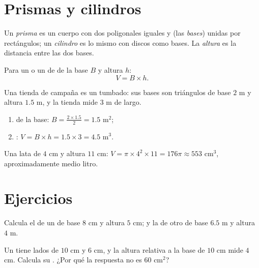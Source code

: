 \section{Prismas y cilindros}

\begin{definition}\label{def:g7:areas:prism}
Un \emph{prisma} es un cuerpo con dos  poligonales
iguales y  (las \emph{bases}) unidas por rectángulos; un
\emph{cilindro} es lo mismo con discos como bases. La
\emph{altura} es la distancia entre las dos bases.
\end{definition}

\begin{theorem}[Volúmenes]\label{thm:g7:areas:volume}
Para un  o un  de  de la base $B$ y altura $h$:
\[
V = B \times h .
\]
\end{theorem}
\admitted

\begin{example}\label{ex:g7:areas:volume}
Una tienda de campaña es un  tumbado: sus bases son triángulos de base
$2$ m y altura $1.5$ m, y la tienda mide $3$ m de largo.
\begin{enumerate}
  \item {} de la base: $B = \frac{2 \times 1.5}{2} = 1.5$ m$^2$;
  \item {}: $V = B \times h = 1.5 \times 3 = 4.5$ m$^3$.
\end{enumerate}
Una lata de  $4$ cm y altura $11$ cm:
$V = \pi \times 4^2 \times 11 = 176\pi \approx 553$ cm$^3$, aproximadamente
medio litro.
\end{example}

\section{Ejercicios}

\begin{exercise}[$\star$]\label{exo:g7:areas:1}
Calcula el  de un  de base $8$ cm y altura
$5$ cm; y la de otro de base $6.5$ m y altura $4$ m.
\end{exercise}

\begin{exercise}[$\star$]\label{exo:g7:areas:2}
Un  tiene lados de $10$ cm y $6$ cm, y la altura relativa
a la base de $10$ cm mide $4$ cm. Calcula su . ¿Por qué la
respuesta no es $60$ cm$^2$?
\end{exercise}

